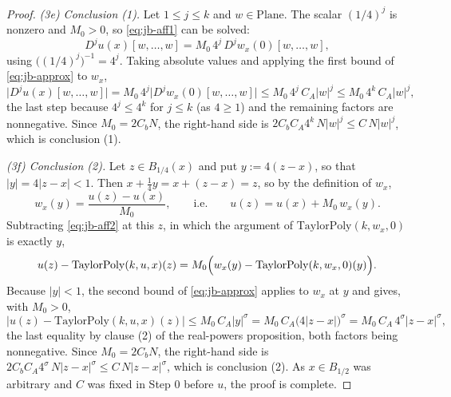 \begin{proof}
\emph{(3e) Conclusion (1).}  Let $1\le j\le k$ and $w\in\mathrm{Plane}$.  The scalar
$(1/4)^{j}$ is nonzero and $M_0>0$, so \eqref{eq:jb-aff1} can be solved:
\[
  D^{j}u(x)[w,\ldots,w]=M_0\,4^{j}\,D^{j}w_x(0)[w,\ldots,w],
\]
using $\bigl((1/4)^{j}\bigr)^{-1}=4^{j}$.  Taking absolute values and applying the first bound
of \eqref{eq:jb-approx} to $w_x$,
\[
  \bigl\lvert D^{j}u(x)[w,\ldots,w]\bigr\rvert
  =M_0\,4^{j}\bigl\lvert D^{j}w_x(0)[w,\ldots,w]\bigr\rvert
  \le M_0\,4^{j}\,C_A\lvert w\rvert^{j}
  \le M_0\,4^{k}\,C_A\lvert w\rvert^{j},
\]
the last step because $4^{j}\le4^{k}$ for $j\le k$ (as $4\ge1$) and the remaining factors are
nonnegative.  Since $M_0=2C_bN$, the right-hand side is
$2C_bC_A4^{k}\,N\lvert w\rvert^{j}\le C\,N\lvert w\rvert^{j}$, which is conclusion (1).

\emph{(3f) Conclusion (2).}  Let $z\in B_{1/4}(x)$ and put $y:=4(z-x)$, so that
$\lvert y\rvert=4\lvert z-x\rvert<1$.  Then $x+\tfrac14y=x+(z-x)=z$, so by the definition of
$w_x$,
\[
  w_x(y)=\frac{u(z)-u(x)}{M_0},\qquad\text{i.e.}\qquad u(z)=u(x)+M_0\,w_x(y).
\]
Subtracting \eqref{eq:jb-aff2} at this $z$, in which the argument of
$\mathrm{TaylorPoly}(k,w_x,0)$ is exactly $y$,
\[
  u(z)-\mathrm{TaylorPoly}(k,u,x)(z)
  =M_0\Bigl(w_x(y)-\mathrm{TaylorPoly}(k,w_x,0)(y)\Bigr).
\]
Because $\lvert y\rvert<1$, the second bound of \eqref{eq:jb-approx} applies to $w_x$ at $y$ and
gives, with $M_0>0$,
\[
  \bigl\lvert u(z)-\mathrm{TaylorPoly}(k,u,x)(z)\bigr\rvert
  \le M_0\,C_A\lvert y\rvert^{\sigma}
  =M_0\,C_A\bigl(4\lvert z-x\rvert\bigr)^{\sigma}
  =M_0\,C_A\,4^{\sigma}\lvert z-x\rvert^{\sigma},
\]
the last equality by clause (2) of the real-powers proposition, both factors being nonnegative.
Since $M_0=2C_bN$, the right-hand side is
$2C_bC_A4^{\sigma}\,N\lvert z-x\rvert^{\sigma}\le C\,N\lvert z-x\rvert^{\sigma}$, which is
conclusion (2).  As $x\in B_{1/2}$ was arbitrary and $C$ was fixed in Step 0 before $u$, the
proof is complete.
\end{proof}
